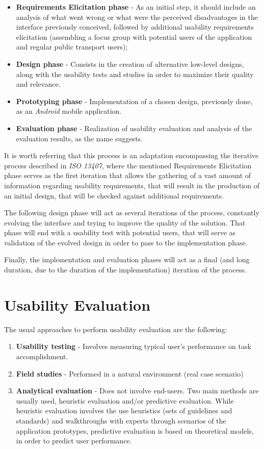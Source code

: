 \begin{itemize}
\item \textbf{Requirements Elicitation phase} - As an initial step, it should include an analysis of what went wrong or what were the perceived disadvantages in the interface previously conceived, followed by additional usability requirements elicitation (assembling a focus group with potential users of the application and regular public transport users);
\item \textbf{Design phase} - Consists in the creation of alternative low-level designs, along with the usability tests and studies in order to maximize their quality and relevance.
\item \textbf{Prototyping phase} - Implementation of a chosen design, previously done, as an \emph{Android} mobile application.
\item \textbf{Evaluation phase} - Realization of usability evaluation and analysis of the evaluation results, as the name suggests.
\end{itemize}

It is worth referring that this process is an adaptation encompassing the iterative process described in \emph{ISO 13407}, where the mentioned Requirements Elicitation phase serves as the first iteration that allows the gathering of a vast amount of information regarding usability requirements, that will result in the production of an initial design, that will be checked against additional requirements.

The following design phase will act as several iterations of the process, constantly evolving the interface and trying to improve the quality of the solution. That phase will end with a usability test with potential users, that will serve as validation of the evolved design in order to pass to the implementation phase.

Finally, the implementation and evaluation phases will act as a final (and long duration, due to the duration of the implementation) iteration of the process. 

\section{Usability Evaluation}

The usual approaches to perform usability evaluation are the following:

\begin{enumerate}
\item \textbf{Usability testing} - Involves measuring typical user's performance on task accomplishment.
\item \textbf{Field studies} - Performed in a natural environment (real case scenario)
\item \textbf{Analytical evaluation} - Does not involve end-users. Two main methods are usually used, heuristic evaluation and/or predictive evaluation. While heuristic evaluation involves the use heuristics (sets of guidelines and standards) and walkthroughs with experts through scenarios of the application prototypes, predictive evaluation is based on theoretical models, in order to predict user performance.
\end{enumerate}

